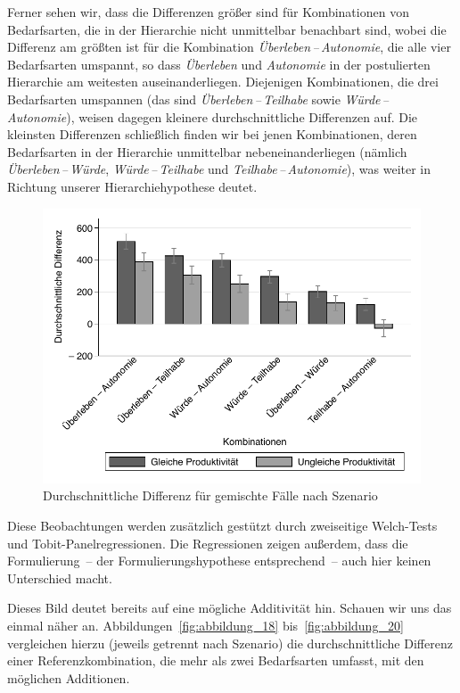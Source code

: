 \documentclass[justified,nobib,nohyper,symmetric,twoside]{tufte-book}
\begin{document}
Ferner sehen wir, dass die Differenzen größer sind für Kombinationen von Bedarfsarten, die in der Hierarchie nicht unmittelbar benachbart sind, wobei die Differenz am größten ist für die Kombination \textit{Überleben\,--\,Autonomie}, die alle vier Bedarfsarten umspannt, so dass \textit{Überleben} und \textit{Autonomie} in der postulierten Hierarchie am weitesten auseinanderliegen.
Diejenigen Kombinationen, die drei Bedarfsarten umspannen (das sind \textit{Überleben\,--\,Teilhabe} sowie \textit{Würde\,--\,Autonomie}), weisen dagegen kleinere durchschnittliche Differenzen auf.
Die kleinsten Differenzen schließlich finden wir bei jenen Kombinationen, deren Bedarfsarten in der Hierarchie unmittelbar nebeneinanderliegen (nämlich \textit{Überleben\,--\,Würde}, \textit{Würde\,--\,Teilhabe} und \textit{Teilhabe\,--\,Autonomie}), was weiter in Richtung unserer Hierarchiehypothese deutet.

\begin{figure}[t]\label{fig:abbildung_17}
   \center
   \caption{Durchschnittliche Differenz für gemischte Fälle nach Szenario}
   \includegraphics[width=0.99\linewidth]{figure_17.pdf}
\end{figure}

Diese Beobachtungen werden zusätzlich gestützt durch \mbox{zweiseitige} Welch-Tests und Tobit-Panelregres\-sionen.
Die Regressionen zeigen außerdem, dass die Formulierung~-- der Formulierungshypothese entsprechend~-- auch hier keinen Unterschied macht.

Dieses Bild deutet bereits auf eine mögliche Additivität hin.
Schauen wir uns das einmal näher an.
Abbildungen~\ref{fig:abbildung_18} bis~\ref{fig:abbildung_20} vergleichen hierzu (jeweils getrennt nach Szenario) die durchschnittliche Differenz einer Referenzkombination, die mehr als zwei Bedarfsarten umfasst, mit den möglichen Additionen.
\end{document}
